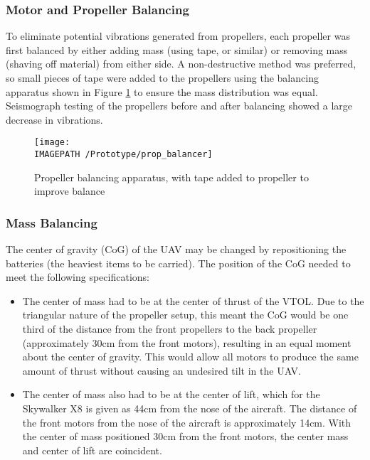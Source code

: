 \subsubsection*{Motor and Propeller Balancing}
To eliminate potential vibrations generated from propellers, each propeller was first balanced by either adding mass (using tape, or similar) or removing mass (shaving off material) from either side. A non-destructive method was preferred, so small pieces of tape were added to the propellers using the balancing apparatus shown in Figure \ref{fig:propbalancing} to ensure the mass distribution was equal.  Seismograph testing of the propellers before and after balancing showed a large decrease in vibrations.

\begin{figure}[!ht]
	\centering
	\texttt{[image: \\IMAGEPATH /Prototype/prop\_balancer]}
	\caption{Propeller balancing apparatus, with tape added to propeller to improve balance}
	\label{fig:propbalancing}
\end{figure}

\subsubsection*{Mass Balancing}
The center of gravity (CoG) of the UAV may be changed by repositioning the batteries (the heaviest items to be carried). The position of the CoG needed to meet the following specifications:

\begin{itemize}
	\item The center of mass had to be at the center of thrust of the VTOL. Due to the triangular nature of the propeller setup, this meant the CoG would be one third of the distance from the front propellers to the back propeller (approximately 30cm from the front motors), resulting in an equal moment about the center of gravity. This would allow all motors to produce the same amount of thrust without causing an undesired tilt in the UAV.
	\item The center of mass also had to be at the center of lift, which for the Skywalker X8 is given as 44cm from the nose of the aircraft\cite{ref:x8kit}. The distance of the front motors from the nose of the aircraft is approximately 14cm. With the center of mass positioned 30cm from the front motors, the center mass and center of lift are coincident.
\end{itemize}
	
